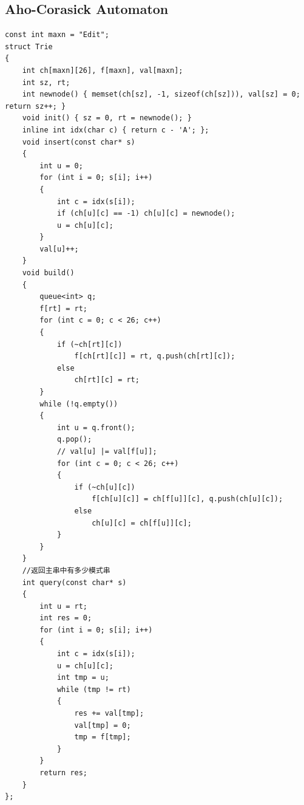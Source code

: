 \documentclass[twoside]{article}
\begin{document}
\subsection{Aho-Corasick Automaton}
\begin{lstlisting}
const int maxn = "Edit";
struct Trie
{
    int ch[maxn][26], f[maxn], val[maxn];
    int sz, rt;
    int newnode() { memset(ch[sz], -1, sizeof(ch[sz])), val[sz] = 0; return sz++; }
    void init() { sz = 0, rt = newnode(); }
    inline int idx(char c) { return c - 'A'; };
    void insert(const char* s)
    {
        int u = 0;
        for (int i = 0; s[i]; i++)
        {
            int c = idx(s[i]);
            if (ch[u][c] == -1) ch[u][c] = newnode();
            u = ch[u][c];
        }
        val[u]++;
    }
    void build()
    {
        queue<int> q;
        f[rt] = rt;
        for (int c = 0; c < 26; c++)
        {
            if (~ch[rt][c])
                f[ch[rt][c]] = rt, q.push(ch[rt][c]);
            else
                ch[rt][c] = rt;
        }
        while (!q.empty())
        {
            int u = q.front();
            q.pop();
            // val[u] |= val[f[u]];
            for (int c = 0; c < 26; c++)
            {
                if (~ch[u][c])
                    f[ch[u][c]] = ch[f[u]][c], q.push(ch[u][c]);
                else
                    ch[u][c] = ch[f[u]][c];
            }
        }
    }
    //返回主串中有多少模式串
    int query(const char* s)
    {
        int u = rt;
        int res = 0;
        for (int i = 0; s[i]; i++)
        {
            int c = idx(s[i]);
            u = ch[u][c];
            int tmp = u;
            while (tmp != rt)
            {
                res += val[tmp];
                val[tmp] = 0;
                tmp = f[tmp];
            }
        }
        return res;
    }
};
\end{lstlisting}
\end{document}
